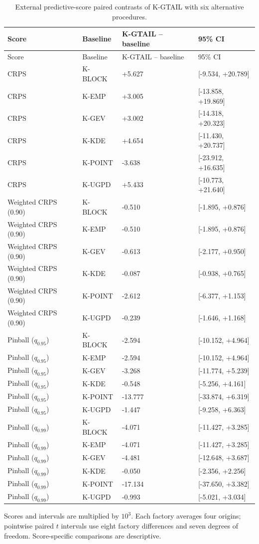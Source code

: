 \begingroup
\fontsize{8.5}{10.5}\selectfont\setlength{\tabcolsep}{3pt}
\begin{longtable}{@{}llll@{}}
\caption{External predictive-score paired contrasts of K-GTAIL with six alternative procedures.}\label{tab:final-si-9}\\
\toprule
Score & Baseline & K-GTAIL -- baseline & 95\% CI\\\midrule\endfirsthead
Score & Baseline & K-GTAIL -- baseline & 95\% CI\\\midrule\endhead
CRPS & K-BLOCK & +5.627 & [-9.534, +20.789]\\
CRPS & K-EMP & +3.005 & [-13.858, +19.869]\\
CRPS & K-GEV & +3.002 & [-14.318, +20.323]\\
CRPS & K-KDE & +4.654 & [-11.430, +20.737]\\
CRPS & K-POINT & -3.638 & [-23.912, +16.635]\\
CRPS & K-UGPD & +5.433 & [-10.773, +21.640]\\
Weighted CRPS (0.90) & K-BLOCK & -0.510 & [-1.895, +0.876]\\
Weighted CRPS (0.90) & K-EMP & -0.510 & [-1.895, +0.876]\\
Weighted CRPS (0.90) & K-GEV & -0.613 & [-2.177, +0.950]\\
Weighted CRPS (0.90) & K-KDE & -0.087 & [-0.938, +0.765]\\
Weighted CRPS (0.90) & K-POINT & -2.612 & [-6.377, +1.153]\\
Weighted CRPS (0.90) & K-UGPD & -0.239 & [-1.646, +1.168]\\
Pinball ($q_{0.95}$) & K-BLOCK & -2.594 & [-10.152, +4.964]\\
Pinball ($q_{0.95}$) & K-EMP & -2.594 & [-10.152, +4.964]\\
Pinball ($q_{0.95}$) & K-GEV & -3.268 & [-11.774, +5.239]\\
Pinball ($q_{0.95}$) & K-KDE & -0.548 & [-5.256, +4.161]\\
Pinball ($q_{0.95}$) & K-POINT & -13.777 & [-33.874, +6.319]\\
Pinball ($q_{0.95}$) & K-UGPD & -1.447 & [-9.258, +6.363]\\
Pinball ($q_{0.99}$) & K-BLOCK & -4.071 & [-11.427, +3.285]\\
Pinball ($q_{0.99}$) & K-EMP & -4.071 & [-11.427, +3.285]\\
Pinball ($q_{0.99}$) & K-GEV & -4.481 & [-12.648, +3.687]\\
Pinball ($q_{0.99}$) & K-KDE & -0.050 & [-2.356, +2.256]\\
Pinball ($q_{0.99}$) & K-POINT & -17.134 & [-37.650, +3.382]\\
Pinball ($q_{0.99}$) & K-UGPD & -0.993 & [-5.021, +3.034]\\
\bottomrule
\end{longtable}
\noindent\footnotesize Scores and intervals are multiplied by $10^3$. Each factory averages four origins; pointwise paired $t$ intervals use eight factory differences and seven degrees of freedom. Score-specific comparisons are descriptive.
\endgroup
